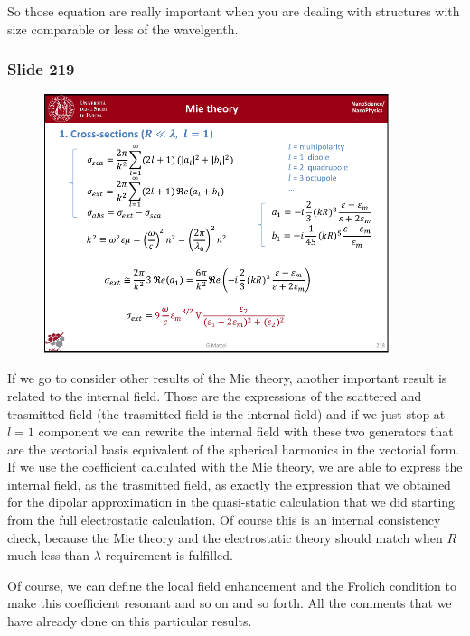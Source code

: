 \documentclass[../main/main.tex]{subfiles}
\begin{document}
So those equation are really important when you are dealing with structures with size comparable or less of the wavelgenth.

\newpage
\subsubsection{Slide 219}

\begin{figure}[h!]
\centering
\includegraphics[page=2,width=0.9\textwidth]{../lessons/pdf_file/14_lesson.pdf}
\end{figure}

If we go to consider other results of the Mie theory,
another important result is related to the internal field.
Those are the expressions of the scattered and trasmitted field (the trasmitted field is the internal field) and if we just stop at $l=1$ component we can rewrite the internal field  with these two generators that are the vectorial basis equivalent of the spherical harmonics in the vectorial form.
If we use the coefficient calculated with the Mie theory, we are able to express the internal field, as the trasmitted field, as exactly the expression that we obtained for the dipolar approximation in the quasi-static calculation that we did starting from the full electrostatic calculation.
Of course this is an internal consistency check, because the Mie theory and the electrostatic theory should match when $R$ much less than $\lambda$ requirement is fulfilled.

Of course, we can define the local field enhancement and the Frolich condition to make this coefficient resonant and so on and so forth. All the comments that we have already done on this particular results.
\end{document}

